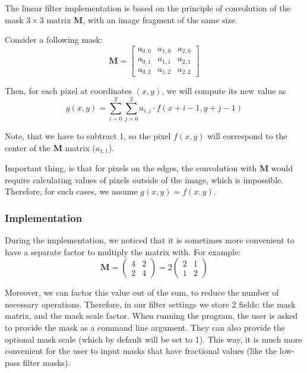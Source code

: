 \documentclass[12pt]{article}
\begin{document}
The linear filter implementation is based on the principle of convolution of the mask $3\times3$ matrix $\mathbf{M}$, with an image fragment of the same size.

Consider a following mask:
\begin{equation}
    \mathbf{M} = \begin{bmatrix}
        a_{0,0} & a_{1,0} & a_{2,0} \\
        a_{0,1} & a_{1,1} & a_{2,1} \\
        a_{0,2} & a_{1,2} & a_{2,2}
    \end{bmatrix}
\end{equation}

Then, for each pixel at coordinates $(x,y)$, we will compute its new value as
\begin{equation}
    g(x,y) = \sum\limits_{i=0}^2 \sum\limits_{j=0}^2 a_{i,j} \cdot f(x + i - 1, y + j - 1)
\end{equation}

Note, that we have to subtract 1, so the pixel $f(x,y)$ will correspond to the center of the $\mathbf{M}$ matrix ($a_{1,1}$).

Important thing, is that for pixels on the edges,
the convolution with $\mathbf{M}$ would require calculating values of pixels outside of the image, which is impossible.
Therefore, for such cases, we assume $g(x,y) = f(x,y)$.

\subsubsection{Implementation}

During the implementation, we noticed that it is sometimes more convenient
to have a separate factor to multiply the matrix with.
For example:
\[
    \mathbf{M} = \begin{pmatrix}
        4 & 2 \\ 2 & 4
    \end{pmatrix} = 2 \begin{pmatrix}
        2 & 1 \\ 1 & 2
    \end{pmatrix}
\]

Moreover, we can factor this value out of the sum, to reduce the number of necessary operations.
Therefore, in our filter settings we store 2 fields: the mask matrix, and the mask scale factor.
When running the program, the user is asked to provide the mask as a command line argument.
They can also provide the optional mask scale (which by default will be set to 1).
This way, it is much more convenient for the user to input masks that have fractional values (like the low-pass filter masks).
\end{document}
